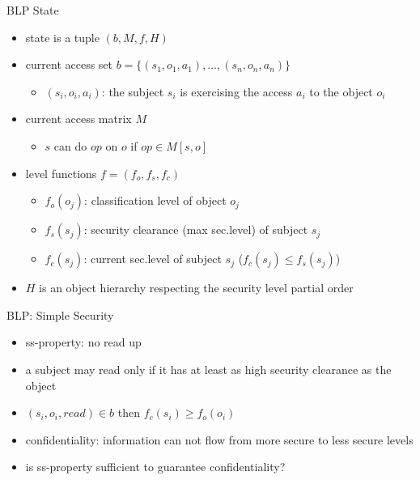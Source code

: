 \documentclass{beamer}
\begin{document}
\begin{frame}{BLP State}
  \begin{itemize}
  \item state is a tuple $(b,M,f, H)$
  \item current access set $b = \{(s_1,o_1,a_1),\dots,(s_n,o_n,a_n)\}$
    \begin{itemize}
    \item $(s_i,o_i,a_i)$: the subject $s_i$ is exercising the access
      $a_i$ to the object $o_i$
    \end{itemize}
  \item current access matrix $M$
    \begin{itemize}
    \item $s$ can do $op$ on $o$ if $op \in M[s,o]$
    \end{itemize}
  \item level functions $f=(f_o, f_s, f_c)$
    \begin{itemize}
      \item $f_o(o_j)$: classification level of object $o_j$
      \item $f_s(s_j)$: security clearance (max sec.level) of subject $s_j$
      \item $f_c(s_j)$: current sec.level of subject $s_j$
        ($f_c(s_j) \leq f_s(s_j)$)
    \end{itemize}
    \item $H$ is an object hierarchy respecting the
      security level partial order
  \end{itemize}
\end{frame}

\begin{frame}{BLP: Simple Security}
  \begin{itemize}
  \item ss-property: no read up
  \item a subject may read only if it has at least as high security
    clearance as the object
  \item $(s_i, o_i, read) \in b$ then
    $f_c(s_i) \geq f_o(o_i)$
  \item<2-> \alert{confidentiality}: information can not flow from more secure to 
        less secure levels
  \item<3-> is ss-property sufficient to guarantee confidentiality?
  \end{itemize}
\end{frame}
\end{document}
